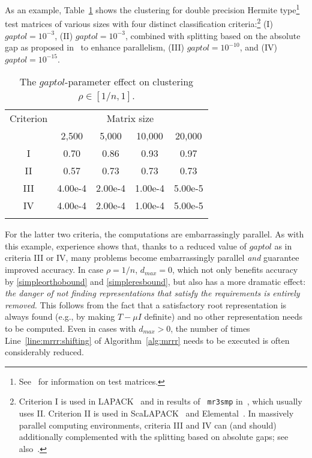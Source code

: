 \documentclass[final]{siamltex}
\begin{document}
 As an example, Table~\ref{tab:clustering}
 shows the clustering for double precision Hermite 
 type\footnote{See~\cite{Marques:2008} for information on test matrices.} test matrices of
 various sizes with four distinct classification criteria:\footnote{Criterion I is used in LAPACK~\cite{DesignMRRR} and in results of {\tt
    mr3smp} in~\cite{mr3smp}, which usually uses II. Criterion II is used in
  ScaLAPACK~\cite{Vomel:2010:ScaLAPACKsMRRR} and
  Elemental~\cite{EleMRRR}. In massively parallel computing environments,
  criteria III and IV can (and should) additionally complemented with the
  splitting based on absolute gaps; see also~\cite{mixedtr}.} 
(I) $gaptol = 10^{-3}$, (II) $gaptol = 10^{-3}$, combined with splitting based on
the absolute gap as proposed in~\cite{VoemelRefinedTree2007tr} to enhance
parallelism, (III) $gaptol = 10^{-10}$, and (IV) $gaptol = 10^{-15}$.
\begin{table}[htb]
\begin{center}
\small
\begin{tabular}{c@{\quad\quad\quad}cccc}
\toprule
Criterion &   \multicolumn{4}{c}{Matrix size} \\
               & 2{,}500 & 5{,}000 & 10{,}000 & 20{,}000 \\
\midrule
I  &  0.70  &         0.86   &  0.93  & 0.97 \\
II &  0.57   &        0.73   &  0.73  & 0.73 \\
III &  4.00e-4  &   2.00e-4   &  1.00e-4  & 5.00e-5  \\
IV &  4.00e-4  &   2.00e-4   &  1.00e-4  & 5.00e-5 \\
\bottomrule\noalign{\smallskip}
\end{tabular} 
\end{center}
\caption{The $gaptol$-parameter effect on clustering $\rho \in [1/n,1]$.  
}
\label{tab:clustering}
\end{table}
For the latter two criteria, the computations are embarrassingly parallel.
As with this example, experience shows that, thanks to a reduced value of
$gaptol$ as in criteria III or IV, many problems 
become embarrassingly parallel {\em and} guarantee improved accuracy. 
In case $\rho = 1/n$, $d_{max}= 0$, which not only benefits accuracy by
\eqref{simpleorthobound} and \eqref{simpleresbound}, but also has a 
more dramatic effect: {\it the danger of 
not finding representations that satisfy the requirements is entirely
removed.} This follows from the fact that a satisfactory root representation is 
always found (e.g., by making $T - \mu I$ definite) and no other
representation needs to be computed. 
Even in cases with $d_{max} > 0$, the
number of times Line~\ref{line:mrrr:shifting} of Algorithm~\ref{alg:mrrr}
needs to be executed is often considerably reduced. 
\end{document}
